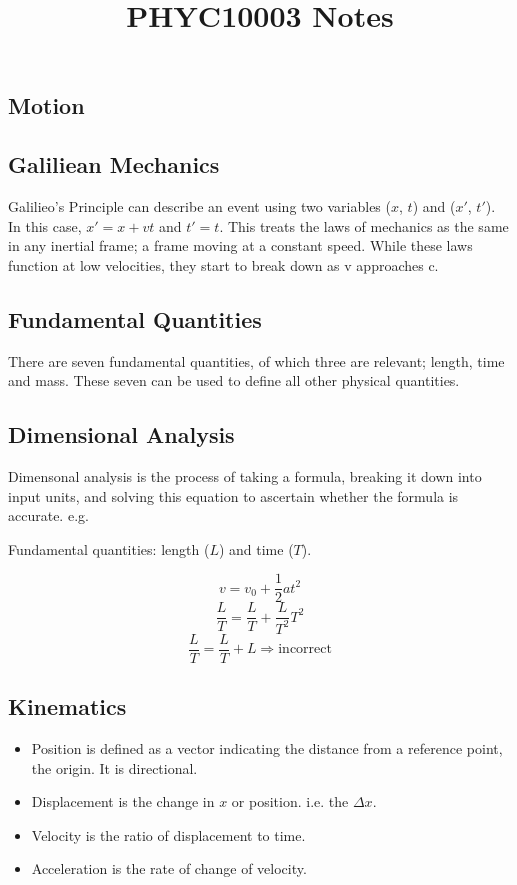 \documentclass[12pt]{report}
\begin{document}
\begin{flushleft}
\title{PHYC10003 Notes}
\chapter*{Motion}

\section*{Galiliean Mechanics}
Galilieo's Principle can describe an event using two variables (\(x\), \(t\))
and (\(x\prime\), \(t\prime\)). In this case, \(x\prime = x + vt\) and 
\(t\prime = t\). This treats the laws of mechanics as the same in any inertial
frame; a frame moving at a constant speed. While these laws function at low 
velocities, they start to break down as v approaches c.

\section*{Fundamental Quantities}
There are seven fundamental quantities, of which three are relevant; length, 
time and mass. These seven can be used to define all other physical quantities.

\section*{Dimensional Analysis}
Dimensonal analysis is the process of taking a formula, breaking it down into 
input units, and solving this equation to ascertain whether the formula is 
accurate. e.g.

\bigskip
\begin{center}
    Fundamental quantities: length (\(L\)) and time (\(T\)).
\end{center}
\[v = v_0 + \frac{1}{2}at^2\]
\[\frac{L}{T} = \frac{L}{T} + \frac{L}{T^2}T^2\]
\[\frac{L}{T} = \frac{L}{T} + L \Rightarrow \mathrm{incorrect}\]

\section*{Kinematics}
\begin{itemize}
    \item Position is defined as a vector indicating the distance from a 
    reference point, the origin. It is directional.
    \item Displacement is the change in \(x\) or position. i.e. the 
    \(\Delta x\).
    \item Velocity is the ratio of displacement to time. 
    \item Acceleration is the rate of change of velocity.
\end{itemize}


\end{flushleft}
\end{document}
